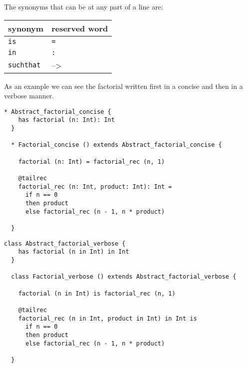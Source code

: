 \documentclass[12pt,a4paper]{book}
\newcommand{\srccode}[1]{\texttt{{#1}}}
\newcommand{\reservedWord}[1]{{\color{blue}\srccode{#1}}\xspace}
\newcommand{\sdef}{\srccode{=}}
\newcommand{\scolon}{\srccode{:}}
\newcommand{\sis}{\reservedWord{is}}
\newcommand{\scin}{\reservedWord{in}}
\newcommand{\ssuchthat}{\reservedWord{suchthat}}
\newcommand{\lambdaSymbol}{{\tiny--\textgreater}\xspace}
\begin{document}
    The synonyms that can be at any part of a line are:

    \begin{center}
        \begin{tabular}{|ll|}
            \hline
            \textbf{synonym} & \textbf{reserved word} \\
            \hline
            \sis             & \sdef                  \\
            \hline
            \scin            & \scolon                \\
            \hline
            \ssuchthat       & \lambdaSymbol          \\
            \hline
        \end{tabular}
    \end{center}

    As an example we can see the factorial written first in a concise and then in a verbose manner.

    \begin{lstlisting}[label={lst:exampleFactorialConcise}]
  * Abstract_factorial_concise {
    has factorial (n: Int): Int
  }

  * Factorial_concise () extends Abstract_factorial_concise {

    factorial (n: Int) = factorial_rec (n, 1)

    @tailrec
    factorial_rec (n: Int, product: Int): Int =
      if n == 0
      then product
      else factorial_rec (n - 1, n * product)

  }
    \end{lstlisting}


    \begin{lstlisting}[label={lst:exampleFactorialVerbose}]
  class Abstract_factorial_verbose {
    has factorial (n in Int) in Int
  }

  class Factorial_verbose () extends Abstract_factorial_verbose {

    factorial (n in Int) is factorial_rec (n, 1)

    @tailrec
    factorial_rec (n in Int, product in Int) in Int is
      if n == 0
      then product
      else factorial_rec (n - 1, n * product)

  }
    \end{lstlisting}
\end{document}
